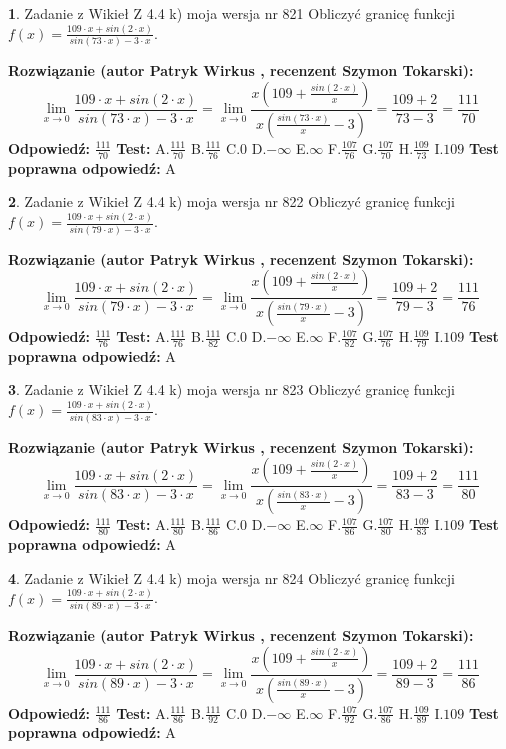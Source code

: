 \documentclass[12pt, a4paper]{article}
\theoremstyle{definition} %
\newtheorem{zad}{}
\newcommand{\zadStart}[1]{\begin{zad}#1\newline}
\newcommand{\zadStop}{\end{zad}}
\newcommand{\rozwStart}[2]{\noindent \textbf{Rozwiązanie (autor #1 , recenzent #2): }\newline}
\newcommand{\rozwStop}{\newline}
\newcommand{\odpStart}{\noindent \textbf{Odpowiedź:}\newline}
\newcommand{\odpStop}{\newline}
\newcommand{\testStart}{\noindent \textbf{Test:}\newline}
\newcommand{\testStop}{\newline}
\newcommand{\kluczStart}{\noindent \textbf{Test poprawna odpowiedź:}\newline}
\newcommand{\kluczStop}{\newline}
\begin{document}
\zadStart{Zadanie z Wikieł Z 4.4 k) moja wersja nr 821}
Obliczyć granicę funkcji $f(x)=\frac{109\cdot x +sin(2\cdot x)}{sin(73\cdot x) -3\cdot x}$.
\zadStop
\rozwStart{Patryk Wirkus}{Szymon Tokarski}
$$\lim\limits_{x\to 0}\frac{109\cdot x +sin(2\cdot x)}{sin(73\cdot x) -3\cdot x}
=\lim\limits_{x\to 0}\frac{x(109+\frac{sin(2\cdot x)}{x})}{x(\frac{sin(73\cdot x)}{x}-3)}
=\frac{109+2}{73-3} = \frac{111}{70}$$
\rozwStop
\odpStart
$\frac{111}{70}$
\odpStop
\testStart
A.$\frac{111}{70}$
B.$\frac{111}{76}$
C.$0$
D.$-\infty$
E.$\infty$
F.$\frac{107}{76}$
G.$\frac{107}{70}$
H.$\frac{109}{73}$
I.$109$
\testStop
\kluczStart
A
\kluczStop



\zadStart{Zadanie z Wikieł Z 4.4 k) moja wersja nr 822}
Obliczyć granicę funkcji $f(x)=\frac{109\cdot x +sin(2\cdot x)}{sin(79\cdot x) -3\cdot x}$.
\zadStop
\rozwStart{Patryk Wirkus}{Szymon Tokarski}
$$\lim\limits_{x\to 0}\frac{109\cdot x +sin(2\cdot x)}{sin(79\cdot x) -3\cdot x}
=\lim\limits_{x\to 0}\frac{x(109+\frac{sin(2\cdot x)}{x})}{x(\frac{sin(79\cdot x)}{x}-3)}
=\frac{109+2}{79-3} = \frac{111}{76}$$
\rozwStop
\odpStart
$\frac{111}{76}$
\odpStop
\testStart
A.$\frac{111}{76}$
B.$\frac{111}{82}$
C.$0$
D.$-\infty$
E.$\infty$
F.$\frac{107}{82}$
G.$\frac{107}{76}$
H.$\frac{109}{79}$
I.$109$
\testStop
\kluczStart
A
\kluczStop



\zadStart{Zadanie z Wikieł Z 4.4 k) moja wersja nr 823}
Obliczyć granicę funkcji $f(x)=\frac{109\cdot x +sin(2\cdot x)}{sin(83\cdot x) -3\cdot x}$.
\zadStop
\rozwStart{Patryk Wirkus}{Szymon Tokarski}
$$\lim\limits_{x\to 0}\frac{109\cdot x +sin(2\cdot x)}{sin(83\cdot x) -3\cdot x}
=\lim\limits_{x\to 0}\frac{x(109+\frac{sin(2\cdot x)}{x})}{x(\frac{sin(83\cdot x)}{x}-3)}
=\frac{109+2}{83-3} = \frac{111}{80}$$
\rozwStop
\odpStart
$\frac{111}{80}$
\odpStop
\testStart
A.$\frac{111}{80}$
B.$\frac{111}{86}$
C.$0$
D.$-\infty$
E.$\infty$
F.$\frac{107}{86}$
G.$\frac{107}{80}$
H.$\frac{109}{83}$
I.$109$
\testStop
\kluczStart
A
\kluczStop



\zadStart{Zadanie z Wikieł Z 4.4 k) moja wersja nr 824}
Obliczyć granicę funkcji $f(x)=\frac{109\cdot x +sin(2\cdot x)}{sin(89\cdot x) -3\cdot x}$.
\zadStop
\rozwStart{Patryk Wirkus}{Szymon Tokarski}
$$\lim\limits_{x\to 0}\frac{109\cdot x +sin(2\cdot x)}{sin(89\cdot x) -3\cdot x}
=\lim\limits_{x\to 0}\frac{x(109+\frac{sin(2\cdot x)}{x})}{x(\frac{sin(89\cdot x)}{x}-3)}
=\frac{109+2}{89-3} = \frac{111}{86}$$
\rozwStop
\odpStart
$\frac{111}{86}$
\odpStop
\testStart
A.$\frac{111}{86}$
B.$\frac{111}{92}$
C.$0$
D.$-\infty$
E.$\infty$
F.$\frac{107}{92}$
G.$\frac{107}{86}$
H.$\frac{109}{89}$
I.$109$
\testStop
\kluczStart
A
\kluczStop
\end{document}
